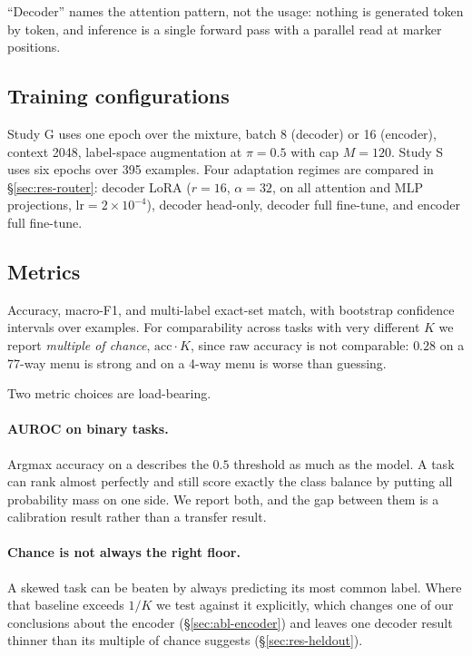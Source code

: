 ``Decoder'' names the attention pattern, not the usage: nothing is
generated token by token, and inference is a single forward pass with a
parallel read at marker positions.

\subsection{Training configurations}

Study G uses one epoch over the mixture, batch 8 (decoder) or 16
(encoder), context 2048, label-space augmentation at $\pi{=}0.5$ with cap
$M{=}120$. Study S uses six epochs over 395 examples. Four adaptation
regimes are compared in \S\ref{sec:res-router}: decoder LoRA ($r{=}16$,
$\alpha{=}32$, on all attention and MLP projections, $\text{lr}=2\times
10^{-4}$), decoder head-only, decoder full fine-tune, and encoder full
fine-tune.

\subsection{Metrics}

Accuracy, macro-F1, and multi-label exact-set match, with bootstrap
confidence intervals over examples. For comparability across tasks with
very different $K$ we report \emph{multiple of chance}, $\text{acc} \cdot
K$, since raw accuracy is not comparable: $0.28$ on a 77-way menu is
strong and on a 4-way menu is worse than guessing.

Two metric choices are load-bearing.

\paragraph{AUROC on binary tasks.} Argmax accuracy on a \noul{} describes
the $0.5$ threshold as much as the model. A task can rank almost perfectly
and still score exactly the class balance by putting all probability mass
on one side. We report both, and the gap between them is a calibration
result rather than a transfer result.

\paragraph{Chance is not always the right floor.} A skewed task can be
beaten by always predicting its most common label. Where that baseline
exceeds $1/K$ we test against it explicitly, which changes one of our
conclusions about the encoder (\S\ref{sec:abl-encoder}) and leaves one
decoder result thinner than its multiple of chance suggests
(\S\ref{sec:res-heldout}).

